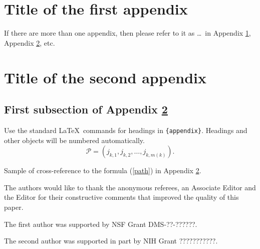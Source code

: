 \documentclass[aihp]{imsart}
\theoremstyle{plain}
\theoremstyle{remark}
\begin{document}
\begin{appendix}
\section{Title of the first appendix}\label{appA}
If there are more than one appendix, then please refer to it
as \ldots\ in Appendix \ref{appA}, Appendix \ref{appB}, etc.

\section{Title of the second appendix}\label{appB}
\subsection{First subsection of Appendix \protect\ref{appB}}

Use the standard \LaTeX\ commands for headings in \verb|{appendix}|.
Headings and other objects will be numbered automatically.
\begin{equation}
\mathcal{P}=(j_{k,1},j_{k,2},\dots,j_{k,m(k)}). \label{path}
\end{equation}

Sample of cross-reference to the formula (\ref{path}) in Appendix \ref{appB}.
\end{appendix}

\begin{acks}[Acknowledgments]
The authors would like to thank the anonymous referees, an Associate
Editor and the Editor for their constructive comments that improved the
quality of this paper.
\end{acks}

\begin{funding}

The first author was supported by NSF Grant DMS-??-??????.

The second author was supported in part by NIH Grant ???????????.
\end{funding}
\end{document}
